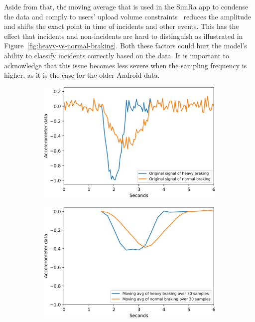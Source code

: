 Aside from that, the moving average that is used in the SimRa app to condense the data and comply to users' upload volume constraints~\cite{karakaya2020simra} reduces the amplitude and shifts the exact point in time of incidents and other events.
This has the effect that incidents and non-incidents are hard to distinguish as illustrated in Figure~\ref{fig:heavy-vs-normal-braking}.
Both these factors could hurt the model's ability to classify incidents correctly based on the data.
It is important to acknowledge that this issue becomes less severe when the sampling frequency is higher, as it is the case for the older Android data.

\begin{figure}%
	\centering
	\begin{subfigure}[b]{0.475\textwidth}
		\centering
		\includegraphics[width=\textwidth]{fig/heavy_vs_normal_braking}
	\end{subfigure}
	\hfill
	\begin{subfigure}[b]{0.475\textwidth}
		\centering
		\includegraphics[width=\textwidth]{fig/mvn_avg_heavy_vs_normal_braking.png}

\end{subfigure}
\end{figure}
